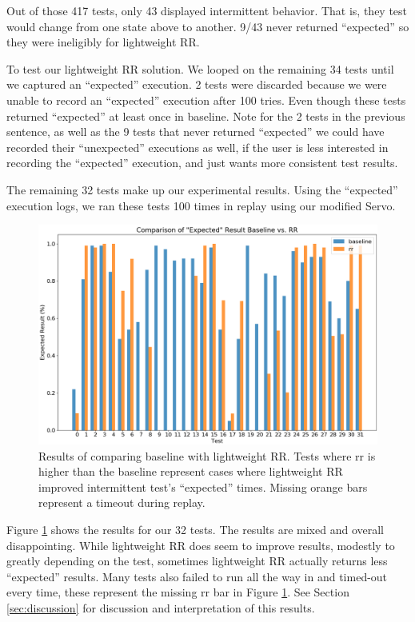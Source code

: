 \documentclass{article}
\begin{document}
Out of those 417 tests, only 43 displayed intermittent behavior. That is, they test
would change from one state above to another. 9/43 never returned
``expected'' so they were ineligibly for lightweight RR.

To test our lightweight RR solution. We looped on the remaining 34 tests until
we captured an ``expected'' execution. 2 tests were
discarded because we were unable to record an ``expected'' execution after 100
tries. Even though these tests returned ``expected'' at least once in baseline. Note
for the 2 tests in the previous sentence, as well as the 9 tests that never returned
``expected'' we could have recorded their ``unexpected'' executions as well, if the user
is less interested in recording the ``expected'' execution, and just wants more consistent
test results.

The remaining 32 tests make up our experimental results. Using the ``expected'' execution
logs, we ran these tests 100 times in replay using our modified Servo.

\begin{figure}
  \includegraphics[width=\linewidth]{result_comparison.png}
  \caption{Results of comparing baseline with lightweight RR. Tests where rr
    is higher than the baseline represent cases where lightweight RR improved intermittent
    test's ``expected'' times. Missing orange bars represent a timeout during replay. }
  \label{fig:result1}
\end{figure}

Figure \ref{fig:result1} shows the results for our 32 tests. The results are
mixed and overall disappointing. While lightweight RR does seem to improve results,
modestly to greatly depending on the test, sometimes lightweight RR actually returns
less ``expected'' results. Many tests also failed to run all the way in and timed-out
every time, these represent the missing rr bar in Figure \ref{fig:result1}. See Section \ref{sec:discussion} for discussion and interpretation of this results.
\end{document}
